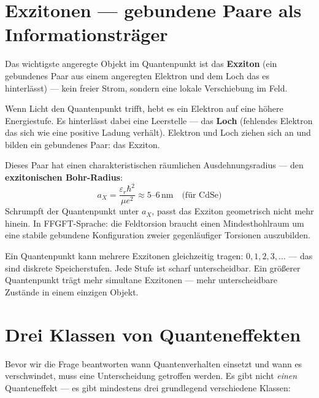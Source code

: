 \section{Exzitonen --- gebundene Paare als Informationsträger}
\label{sec:exzitonen}

Das wichtigste angeregte Objekt im Quantenpunkt ist das
\textbf{Exziton} (ein gebundenes Paar aus einem angeregten
Elektron und dem Loch das es hinterlässt) ---
kein freier Strom, sondern eine lokale Verschiebung im Feld.

Wenn Licht den Quantenpunkt trifft, hebt es ein Elektron
auf eine höhere Energiestufe. Es hinterlässt dabei eine
Leerstelle --- das \textbf{Loch} (fehlendes Elektron das sich
wie eine positive Ladung verhält). Elektron und Loch
ziehen sich an und bilden ein gebundenes Paar: das Exziton.

Dieses Paar hat einen charakteristischen räumlichen Ausdehnungsradius
--- den \textbf{exzitonischen Bohr-Radius}:
\begin{equation}
  a_X = \frac{\varepsilon_r \hbar^2}{\mu e^2} \approx 5\text{--}6\,\text{nm}
  \quad \text{(für CdSe)}
\end{equation}
Schrumpft der Quantenpunkt unter $a_X$, passt das Exziton
geometrisch nicht mehr hinein. In FFGFT-Sprache: die Feldtorsion
braucht einen Mindesthohlraum um eine stabile gebundene Konfiguration
zweier gegenläufiger Torsionen auszubilden.

Ein Quantenpunkt kann mehrere Exzitonen gleichzeitig tragen:
$0, 1, 2, 3, \ldots$ --- das sind diskrete Speicherstufen.
Jede Stufe ist scharf unterscheidbar. Ein größerer Quantenpunkt
trägt mehr simultane Exzitonen --- mehr unterscheidbare Zustände
in einem einzigen Objekt.

\section{Drei Klassen von Quanteneffekten}
\label{sec:drei-klassen}

Bevor wir die Frage beantworten wann Quantenverhalten
einsetzt und wann es verschwindet, muss eine Unterscheidung
getroffen werden. Es gibt nicht \emph{einen} Quanteneffekt ---
es gibt mindestens drei grundlegend verschiedene Klassen:

